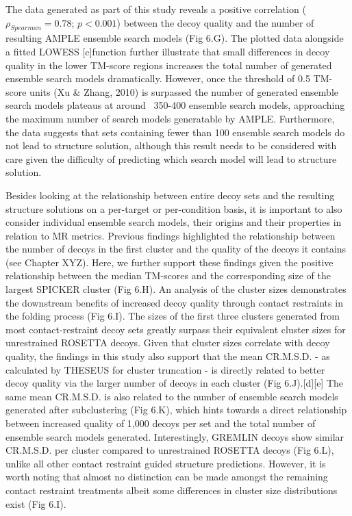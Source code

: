 The data generated as part of this study reveals a positive correlation ($\rho_{Spearman}=0.78$; $p<0.001$) between the decoy quality and the number of resulting AMPLE ensemble search models (Fig 6.G). The plotted data alongside a fitted LOWESS [c]function further illustrate that small differences in decoy quality in the lower TM-score regions increases the total number of generated ensemble search models dramatically. However, once the threshold of 0.5 TM-score units (Xu \& Zhang, 2010) is surpassed the number of generated ensemble search models plateaus at around ~350-400 ensemble search models, approaching the maximum number of search models generatable by AMPLE. Furthermore, the data suggests that sets containing fewer than 100 ensemble search models do not lead to structure solution, although this result needs to be considered with care given the difficulty of predicting which search model will lead to structure solution.

Besides looking at the relationship between entire decoy sets and the resulting structure solutions on a per-target or per-condition basis, it is important to also consider individual ensemble search models, their origins and their properties in relation to MR metrics. Previous findings highlighted the relationship between the number of decoys in the first cluster and the quality of the decoys it contains (see Chapter XYZ). Here, we further support these findings given the positive relationship between the median TM-scores and the corresponding size of the largest SPICKER cluster (Fig 6.H). An analysis of the cluster sizes demonstrates the downstream benefits of increased decoy quality through contact restraints in the folding process (Fig 6.I). The sizes of the first three clusters generated from most contact-restraint decoy sets greatly surpass their equivalent cluster sizes for unrestrained ROSETTA decoys. Given that cluster sizes correlate with decoy quality, the findings in this study also support that the mean C\textalpha R.M.S.D. - as calculated by THESEUS for cluster truncation - is directly related to better decoy quality via the larger number of decoys in each cluster (Fig 6.J).[d][e] The same mean C\textalpha R.M.S.D. is also related to the number of ensemble search models generated after subclustering (Fig 6.K), which hints towards a direct relationship between increased quality of 1,000 decoys per set and the total number of ensemble search models generated. Interestingly, GREMLIN decoys show similar C\textalpha R.M.S.D. per cluster compared to unrestrained ROSETTA decoys (Fig 6.L), unlike all other contact restraint guided structure predictions. However, it is worth noting that almost no distinction can be made amongst the remaining contact restraint treatments albeit some differences in cluster size distributions exist (Fig 6.I).

